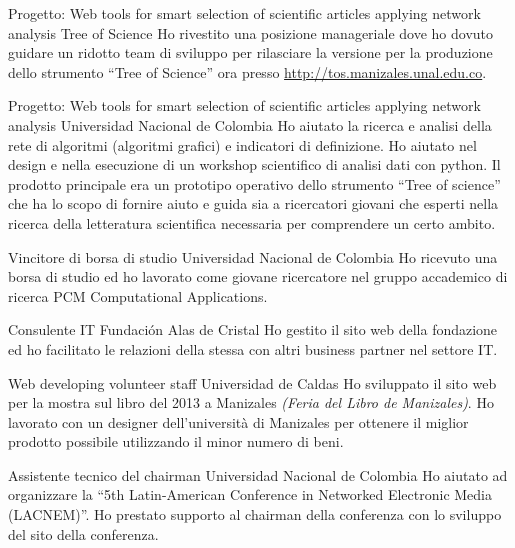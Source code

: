\documentclass[12pt,english]{moderncv}
\begin{document}
        {Progetto: Web tools for smart selection of scientific articles applying network analysis}
        {Tree of Science}
        {}
        {}
        {%
            Ho rivestito una posizione manageriale dove ho dovuto guidare un ridotto team di sviluppo per rilasciare la versione per la produzione dello strumento ``Tree of Science'' ora presso \url{http://tos.manizales.unal.edu.co}.
        }

        {Progetto: Web tools for smart selection of scientific articles applying network analysis}
        {Universidad Nacional de Colombia}
        {}
        {}
        {%
            Ho aiutato la ricerca e analisi della rete di algoritmi (algoritmi grafici) e indicatori di definizione. 
            Ho aiutato nel design e nella esecuzione di un workshop scientifico di analisi dati con python.
            Il prodotto principale era un prototipo operativo dello strumento ``Tree of science'' che ha lo scopo di fornire aiuto e guida sia a ricercatori giovani che esperti nella ricerca della letteratura scientifica necessaria per comprendere un certo ambito.
        }

        {Vincitore di borsa di studio}
        {Universidad Nacional de Colombia}
        {}
        {}
        {%
            Ho ricevuto una borsa di studio ed ho lavorato come giovane ricercatore nel gruppo accademico di ricerca PCM Computational Applications.
        }

        {Consulente IT}
        {Fundación Alas de Cristal}
        {}
        {}
        {%
            Ho gestito il sito web della fondazione ed ho facilitato le relazioni della stessa con altri business partner nel settore IT.
        }

        {Web developing volunteer staff}
        {Universidad de Caldas}
        {}
        {}
        {%
            Ho sviluppato il sito web per la mostra sul libro del 2013 a Manizales \textit{(Feria del Libro de Manizales)}. Ho lavorato con un designer dell'universit\`a di Manizales per ottenere il miglior prodotto possibile utilizzando il minor numero di beni.
        }

        {Assistente tecnico del chairman}
        {Universidad Nacional de Colombia}
        {}
        {}
        {%
            Ho aiutato ad organizzare la ``5th Latin-American Conference
            in Networked Electronic Media (LACNEM)''. 
            Ho prestato supporto al chairman della conferenza con lo sviluppo del sito della conferenza.
        }
\end{document}
